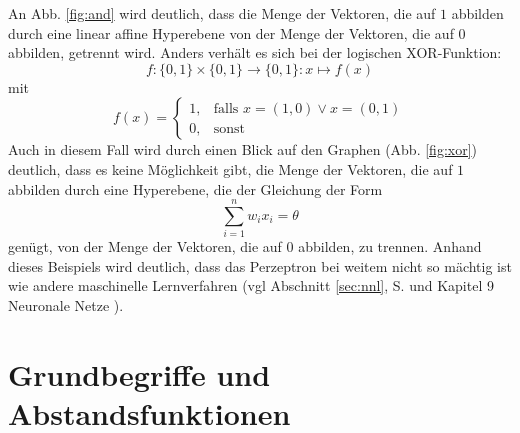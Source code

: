 \documentclass[fontsize=11pt]{scrartcl}
\begin{document}
                    An Abb. \ref{fig:and} wird deutlich, dass die Menge der Vektoren, die auf $1$ abbilden durch eine linear affine Hyperebene von der Menge der Vektoren, die auf $0$ abbilden, getrennt wird.
                    \newline
                    Anders verhält es sich bei der logischen XOR-Funktion:
                    $$
                        f:\{0,1\}\times\{0,1\}\rightarrow\{0,1\}: x\mapsto f(x)
                    $$
                    mit
                    $$
                        f(x)=\left\{\begin{array}{cl} 1, & \mbox{falls }x=(1,0) \vee x = (0,1)\\
                        0, & \mbox{sonst}\end{array}\right. 
                    $$
                    Auch in diesem Fall wird durch einen Blick auf den Graphen (Abb. \ref{fig:xor}) deutlich, dass es keine Möglichkeit gibt, die Menge der Vektoren, die auf $1$ abbilden durch eine Hyperebene, die der Gleichung der Form
                    $$
                        \sum_{i=1}^nw_ix_i = \theta
                    $$
                    genügt, von der Menge der Vektoren, die auf $0$ abbilden, zu trennen.\cite{ertel2016}
                    \newline
                    Anhand dieses Beispiels wird deutlich, dass das Perzeptron bei weitem nicht so mächtig ist wie andere maschinelle Lernverfahren (vgl Abschnitt \ref{sec:nnl}, S. \pageref{sec:nnl} und \cite{ertel2016} Kapitel 9 \glqq Neuronale Netze \grqq ).

                        
        \section{Grundbegriffe und Abstandsfunktionen}
\end{document}

